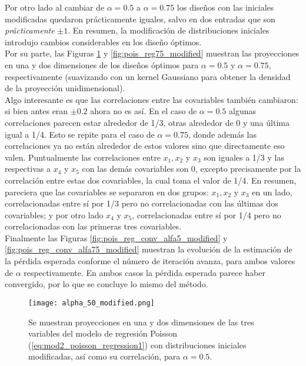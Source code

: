 Por otro lado al cambiar de $\alpha = 0.5$ a $\alpha = 0.75$ los diseños con las iniciales modificadas quedaron prácticamente iguales, salvo en dos entradas que son \textit{prácticamente} $\pm 1$. En resumen, la modificación de distribuciones iniciales introdujo cambios considerables en los diseño óptimos. \\


Por su parte, las Figuras \ref{fig:pois_reg5_modified} y \ref{fig:pois_reg75_modified} muestran las proyecciones en una y dos dimensiones de los diseños óptimos para $\alpha = 0.5$ y $\alpha = 0.75$, respectivamente (suavizando con un kernel Gaussiano para obtener la densidad de la proyección unidimensional).  \\

Algo interesante es que las correlaciones entre las covariables también cambiaron: si bien antes eran $\pm 0.2$ ahora no es así. En el caso de $\alpha = 0.5$ algunas correlaciones parecen estar alrededor de 1/3, otras alrededor de 0 y una última igual a 1/4. Esto se repite para el caso de $\alpha = 0.75$, donde además las correlaciones ya no están alrededor de estos valores sino que directamente eso valen. Puntualmente las correlaciones entre $x_1, x_2$ y $x_3$ son iguales a 1/3 y las respectivas a $x_4$ y $x_5$ con las demás covariables son 0, excepto precisamente por la correlación entre estas dos covariables, la cual toma el valor de 1/4. En resumen, pareciera que las covariables se separaron en dos grupos: $x_1, x_2$ y $x_3$ en un lado, correlacionadas entre sí por 1/3 pero no correlacionadas con las últimas dos covariables; y por otro lado $x_4$ y $x_5$, correlacionadas entre sí por 1/4 pero no correlacionadas con las primeras tres covariables.  \\



Finalmente las Figuras \ref{fig:pois_reg_conv_alfa5_modified} y \ref{fig:pois_reg_conv_alfa75_modified} muestran la evolución de la estimación de la pérdida esperada conforme el número de iteración avanza, para ambos valores de $\alpha$ respectivamente. En ambos casos la pérdida esperada parece haber convergido, por lo que se concluye lo mismo del método.




\begin{figure}[h]
	\centering
    \texttt{[image: alpha\_50\_modified.png]}
    \caption{Se muestran proyecciones en una y dos dimensiones de las tres variables del modelo de regresión Poisson (\ref{eq:mod2_poisson_regression1}) con distribuciones iniciales modificadas, así como su correlación, para $\alpha=0.5$.}
    \label{fig:pois_reg5_modified}
\end{figure}




